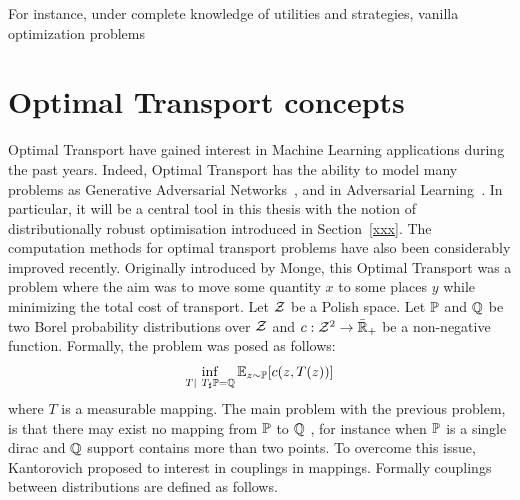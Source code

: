 For instance, under complete knowledge of utilities and strategies, vanilla optimization problems 


\section{Optimal Transport concepts}
Optimal Transport have gained interest in Machine Learning applications during the past years. Indeed, Optimal Transport has the ability to model many problems as Generative Adversarial Networks~\citep{arjovsky2017wasserstein}, and in Adversarial Learning~\citep{sinha2017certifying,pydi2019adversarial,xxx}. In particular, it will be a central tool in this thesis with the notion of distributionally robust optimisation introduced in Section~\ref{xxx}. The computation methods for optimal transport problems have also been considerably improved recently. Originally introduced by Monge, this Optimal Transport was a problem where the aim was to move some quantity $x$ to some places $y$ while minimizing the total cost of transport.  Let $\mathcal{Z}$ be a Polish space. Let $\mathbb{P}$ and $\mathbb{Q}$ be two Borel probability distributions over $\mathcal{Z}$ and $c:\mathcal{Z}^2\to\bar{\mathbb{R}}_+$ be a non-negative function. Formally, the problem was posed as follows:
\begin{align*}
    \inf_{T\mid~T_\sharp\PP = \QQ}\mathbb{E}_{z\sim\PP}\left[c(z,T(z))\right]
\end{align*}
where $T$ is a measurable mapping. The main problem with the previous problem, is that there may exist no mapping from $\mathbb{P}$ to $\mathbb{Q}$ , for instance when $\mathbb{P}$ is a single dirac and $\mathbb{Q}$ support contains more than two points. To overcome this issue, Kantorovich proposed to interest in couplings in mappings. Formally couplings between distributions are defined as follows.



